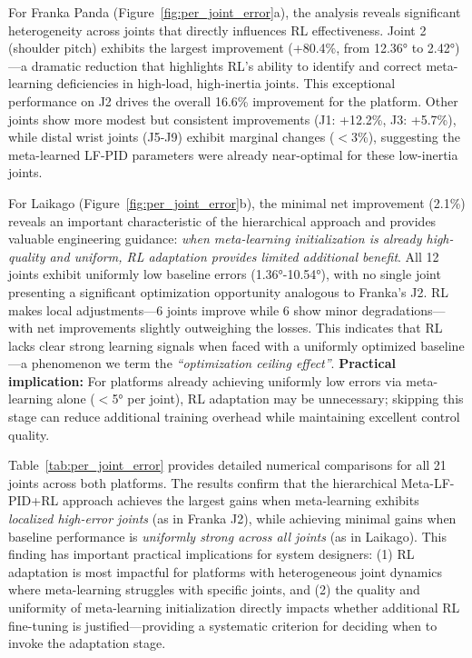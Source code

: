 \documentclass[DTMColor]{ROB-New}
\begin{document}
For Franka Panda (Figure~\ref{fig:per_joint_error}a), the analysis reveals significant heterogeneity across joints that directly influences RL effectiveness. Joint 2 (shoulder pitch) exhibits the largest improvement (+80.4\%, from 12.36° to 2.42°)—a dramatic reduction that highlights RL's ability to identify and correct meta-learning deficiencies in high-load, high-inertia joints. This exceptional performance on J2 drives the overall 16.6\% improvement for the platform. Other joints show more modest but consistent improvements (J1: +12.2\%, J3: +5.7\%), while distal wrist joints (J5-J9) exhibit marginal changes ($<$3\%), suggesting the meta-learned LF-PID parameters were already near-optimal for these low-inertia joints.

For Laikago (Figure~\ref{fig:per_joint_error}b), the minimal net improvement (2.1\%) reveals an important characteristic of the hierarchical approach and provides valuable engineering guidance: \textit{when meta-learning initialization is already high-quality and uniform, RL adaptation provides limited additional benefit}. All 12 joints exhibit uniformly low baseline errors (1.36°-10.54°), with no single joint presenting a significant optimization opportunity analogous to Franka's J2. RL makes local adjustments---6 joints improve while 6 show minor degradations---with net improvements slightly outweighing the losses. This indicates that RL lacks clear strong learning signals when faced with a uniformly optimized baseline---a phenomenon we term the \textit{``optimization ceiling effect''}. \textbf{Practical implication:} For platforms already achieving uniformly low errors via meta-learning alone ($<$5° per joint), RL adaptation may be unnecessary; skipping this stage can reduce additional training overhead while maintaining excellent control quality.

Table~\ref{tab:per_joint_error} provides detailed numerical comparisons for all 21 joints across both platforms. The results confirm that the hierarchical Meta-LF-PID+RL approach achieves the largest gains when meta-learning exhibits \textit{localized high-error joints} (as in Franka J2), while achieving minimal gains when baseline performance is \textit{uniformly strong across all joints} (as in Laikago). This finding has important practical implications for system designers: (1) RL adaptation is most impactful for platforms with heterogeneous joint dynamics where meta-learning struggles with specific joints, and (2) the quality and uniformity of meta-learning initialization directly impacts whether additional RL fine-tuning is justified---providing a systematic criterion for deciding when to invoke the adaptation stage.
\end{document}
